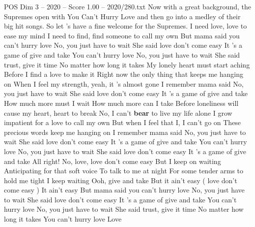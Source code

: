 \begin{textsample}{POS Dim 3 – 2020 – Score 1.00 – 2020/280.txt}  \label{ex:f3_pos_020}
Now with a great background, the Supremes open with You Can't Hurry Love and then go into a medley of their big hit songs.
So let 's have a fine welcome for the Supremes.
I need love, love to ease my mind I need to find, find someone to call my own But mama said you can't hurry love No, you just have to wait She said love don't come easy It 's a game of give and take You can't hurry love No, you just have to wait She said trust, give it time No matter how long it takes My lonely heart must start aching Before I find a love to make it Right now the only thing that keeps me hanging on When I feel my strength, yeah, it 's almost gone I remember mama said No, you just have to wait She said love don't come easy It 's a game of give and take How much more must I wait How much more can I take Before loneliness will cause my heart, heart to break No, I can't \textbf{bear} to live my life alone I grow impatient for a love to call my own But when I feel that I, I can't go on These precious words keep me hanging on I remember mama said No, you just have to wait She said love don't come easy It 's a game of give and take You can't hurry love No, you just have to wait She said love don't come easy It 's a game of give and take All right!
No, love, love don't come easy But I keep on waiting Anticipating for that soft voice To talk to me at night For some tender arms to hold me tight I keep waiting Ooh, give and take But it ain't easy ( love don't come easy ) It ain't easy But mama said you can't hurry love No, you just have to wait She said love don't come easy It 's a game of give and take You can't hurry love No, you just have to wait She said trust, give it time No matter how long it takes You can't hurry love Love

\end{textsample}
